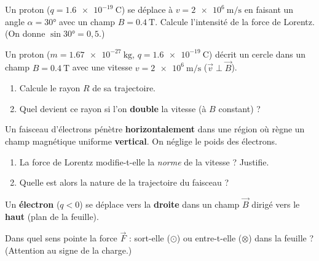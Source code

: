 \documentclass[11pt,a4paper]{article}
\newcommand{\vv}[1]{\vec{#1}}\newcommand{\ds}{\displaystyle}
\begin{document}
\begin{exo}
Un proton ($q=\qty{1.6e-19}{\coulomb}$) se déplace à $v=\qty{2e6}{\metre\per\second}$ en faisant un
angle $\alpha=\ang{30}$ avec un champ $B=\qty{0.4}{\tesla}$. Calcule l'intensité de la force de
Lorentz. (On donne $\sin\ang{30}=0{,}5$.)
\end{exo}

\begin{exo}
Un proton ($m=\qty{1.67e-27}{\kilogram}$, $q=\qty{1.6e-19}{\coulomb}$) décrit un cercle dans un champ
$B=\qty{0.4}{\tesla}$ avec une vitesse $v=\qty{2e6}{\metre\per\second}$ ($\vv{v}\perp\vv{B}$).
\begin{enumerate}[label=\alph*)]
  \item Calcule le rayon $R$ de sa trajectoire.
  \item Quel devient ce rayon si l'on \textbf{double} la vitesse (à $B$ constant) ?
\end{enumerate}
\end{exo}

\begin{exo}
Un faisceau d'électrons pénètre \textbf{horizontalement} dans une région où règne un champ magnétique
uniforme \textbf{vertical}. On néglige le poids des électrons.
\begin{center}
\end{center}
\begin{enumerate}[label=\alph*)]
  \item La force de Lorentz modifie-t-elle la \emph{norme} de la vitesse ? Justifie.
  \item Quelle est alors la nature de la trajectoire du faisceau ?
\end{enumerate}
\end{exo}

\begin{exo}
Un \textbf{électron} ($q<0$) se déplace vers la \textbf{droite} dans un champ $\vv{B}$ dirigé vers
le \textbf{haut} (plan de la feuille).
\begin{center}
\end{center}
Dans quel sens pointe la force $\vv{F}$ : sort-elle ($\odot$) ou entre-t-elle ($\otimes$) dans la
feuille ? (Attention au signe de la charge.)
\end{exo}
\end{document}
